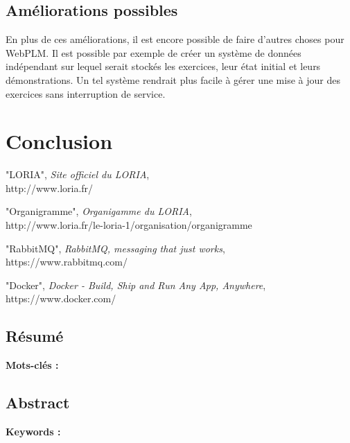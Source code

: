 \documentclass[stage]{tnreport}
\begin{document}
\section {Améliorations possibles}

En plus de ces améliorations, il est encore possible de faire d'autres choses pour WebPLM. Il est possible par exemple de créer un système de données indépendant sur lequel serait stockés les exercices, leur état initial et leurs démonstrations. Un tel système rendrait plus facile à gérer une mise à jour des exercices sans interruption de service.

\cleardoublepage

\chapter*{Conclusion}

\cleardoublepage

\begin{thebibliography}{9}

	"LORIA",
	\emph{Site officiel du LORIA}, \hfill \\
	http://www.loria.fr/

	"Organigramme",
	\emph{Organigamme du LORIA}, \hfill \\
	\hfill {http://www.loria.fr/le-loria-1/organisation/organigramme}

	"RabbitMQ",
	\emph{RabbitMQ, messaging that just works}, \hfill \\
	https://www.rabbitmq.com/

	"Docker",
	\emph{Docker - Build, Ship and Run Any App, Anywhere}, \hfill \\
	https://www.docker.com/

\bibitem{}

\end{thebibliography}

\cleardoublepage
\thispagestyle{empty}

\section*{Résumé}

{\bf Mots-clés :}


\section*{Abstract}

{\bf Keywords :}
\end{document}

